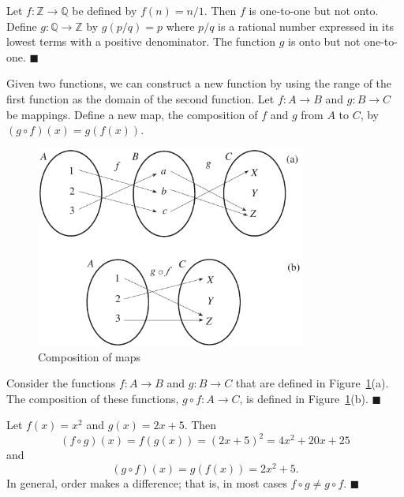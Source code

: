 \medskip

Let $f:{\mathbb Z} \rightarrow {\mathbb Q}$ be defined by $f(n) = n/1$.  Then $f$ is one-to-one but not onto.  Define $g : {\mathbb Q} \rightarrow {\mathbb Z}$ by $g(p/q) = p$ where $p/q$ is a rational number expressed in its lowest terms with a positive denominator.  The function $g$ is onto but not one-to-one. 
\hspace{\fill} $\blacksquare$

\medskip

Given two functions, we can construct a new function by using the range of the first function as the domain of the second function.  Let $f : A \rightarrow B$ and $g : B \rightarrow C$ be mappings.  Define a new map, the {\bfi composition\/} of $f$ and $g$ from $A$ to $C$, by $(g \circ f)(x) = g(f(x))$.

\begin{figure}[htb]
\begin{center}
\centerline {
\includegraphics[width=3.5in]{sets_figure_2}
}
\end{center}
\label{sets_figure_2}
\caption{Composition of maps}
\end{figure}
 
\medskip
 
Consider the functions $f: A \rightarrow B$ and $g: B \rightarrow C$ that are defined in Figure~\ref{sets_figure_2}(a).  The composition of these functions, $g \circ f: A \rightarrow C$, is defined in
Figure~\ref{sets_figure_2}(b). 
\hspace{\fill} $\blacksquare$

\medskip

Let $f(x) = x^2$ and $g(x) = 2x + 5$. Then
$$
(f \circ g)(x) = f(g(x)) = (2x + 5)^2 = 4x^2 + 20x + 25 
$$
and
$$
(g \circ f)(x) = g(f(x)) = 2x^2 + 5.
$$
In general, order makes a difference; that is, in most cases $f \circ g \neq g \circ f$. 
\hspace{\fill} $\blacksquare$
 
